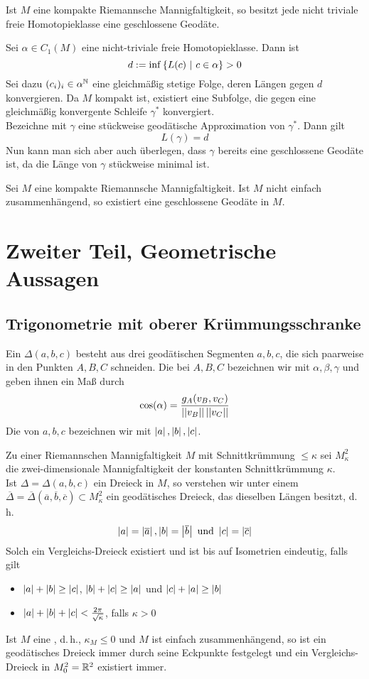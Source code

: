 \documentclass{book}
\renewcommand{\l}[1]{\overline{#1}}
\begin{document}
Ist $M$ eine kompakte Riemannsche Mannigfaltigkeit, so besitzt jede nicht triviale freie Homotopieklasse eine geschlossene Geodäte.

\begin{Beweis}{}
Sei $\alpha \in C_1(M)$ eine nicht-triviale freie Homotopieklasse. Dann ist
\[ d:= \inf \set{L(c)}{c \in \alpha} > 0 \]
Sei dazu $(c_i)_i \in \alpha^{\mathbb{N}}$ eine gleichmäßig stetige Folge, deren Längen gegen $d$ konvergieren. Da $M$ kompakt ist, existiert eine Subfolge, die gegen eine gleichmäßig konvergente Schleife $\gamma^*$ konvergiert.\\
Bezeichne mit $\gamma$ eine stückweise geodätische Approximation von $\gamma^*$. Dann gilt
\[ L(\gamma) = d\]
Nun kann man sich aber auch überlegen, dass $\gamma$ bereits eine geschlossene Geodäte ist, da die Länge von $\gamma$ stückweise minimal ist.
\end{Beweis}

\Kor{}
Sei $M$ eine kompakte Riemannsche Mannigfaltigkeit. Ist $M$ nicht einfach zusammenhängend, so existiert eine geschlossene Geodäte in $M$.

\newpage
\chapter{Zweiter Teil, Geometrische Aussagen}
\section{Trigonometrie mit oberer Krümmungsschranke}
\Def{}
Ein  $\Delta(a,b,c)$ besteht aus drei geodätischen Segmenten $a,b,c$, die sich paarweise in den Punkten $A,B,C$ schneiden. Die  bei $A,B,C$ bezeichnen wir mit $\alpha, \beta, \gamma$ und geben ihnen ein Maß durch
\[ \cos(\alpha) = \frac{g_{A}(v_B,v_C)}{\left|\left|v_B\right|\right|\left|\left|v_C\right|\right|} \]
Die  von $a,b,c$ bezeichnen wir mit $\left|a\right|, \left|b\right|, \left|c\right|$.

\Def{}
Zu einer Riemannschen Mannigfaltigkeit $M$ mit Schnittkrümmung $\leq \kappa$ sei $M^2_\kappa$ die zwei-dimensionale Mannigfaltigkeit der konstanten Schnittkrümmung $\kappa$.\\
Ist $\Delta = \Delta(a,b,c)$ ein Dreieck in $M$, so verstehen wir unter einem  $\l\Delta = \l \Delta(\l a, \l b,\l c) \subset M^2_\kappa$ ein geodätisches Dreieck, das dieselben Längen besitzt, d.\,h.
\[ \bet{a} = \bet{\l a}, \bet{b} = \bet{\l b} \text{ und } \bet{c} = \bet{\l c} \]
Solch ein Vergleichs-Dreieck existiert und ist bis auf Isometrien eindeutig, falls gilt
\begin{itemize}
\item $\left|a\right| + \left|b\right| \geq \left|c\right|$, $\left|b\right| + \left|c\right| \geq \left|a\right|$ und $\left|c\right| + \left|a\right| \geq \left|b\right|$
\item $\left|a\right| + \left|b\right| + \left|c\right| < \frac{2\pi}{\sqrt{\kappa}}$, falls $\kappa > 0$  
\end{itemize}
\Bem{}
Ist $M$ eine , d.\,h., $\kappa_M \leq 0$ und $M$ ist einfach zusammenhängend, so ist ein geodätisches Dreieck immer durch seine Eckpunkte festgelegt und ein Vergleichs-Dreieck in $M^2_0 = \mathbb{R}^2$ existiert immer.
\end{document}
